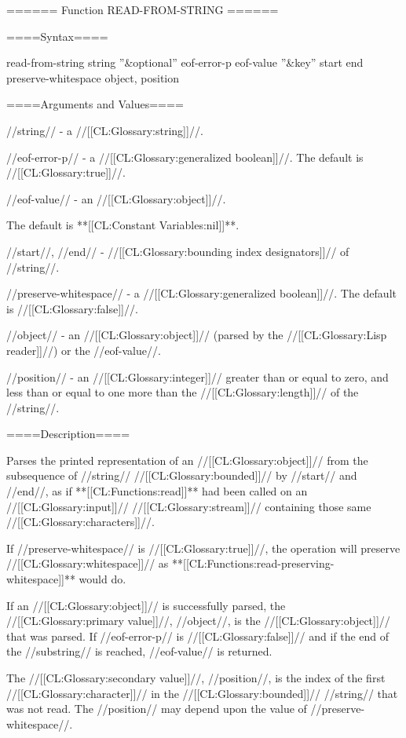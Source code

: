 ====== Function READ-FROM-STRING ======

====Syntax====

\DefunWithValuesNewline read-from-string {string ''&optional'' eof-error-p eof-value ''&key'' start end preserve-whitespace} {object, position}

====Arguments and Values====

//string// - a //[[CL:Glossary:string]]//.

//eof-error-p// - a //[[CL:Glossary:generalized boolean]]//. The default is //[[CL:Glossary:true]]//.

//eof-value// - an //[[CL:Glossary:object]]//.

The default is **[[CL:Constant Variables:nil]]**.

//start//, //end// - //[[CL:Glossary:bounding index designators]]// of //string//. 

//preserve-whitespace// - a //[[CL:Glossary:generalized boolean]]//. The default is //[[CL:Glossary:false]]//.

//object// - an //[[CL:Glossary:object]]// (parsed by the //[[CL:Glossary:Lisp reader]]//) or the //eof-value//.

//position// - an //[[CL:Glossary:integer]]// greater than or equal to zero, and less than or equal to one more than the //[[CL:Glossary:length]]// of the //string//.

====Description====

Parses the printed representation of an //[[CL:Glossary:object]]// from the subsequence of //string// //[[CL:Glossary:bounded]]// by //start// and //end//, as if **[[CL:Functions:read]]** had been called on an //[[CL:Glossary:input]]// //[[CL:Glossary:stream]]// containing those same //[[CL:Glossary:characters]]//.

If //preserve-whitespace// is //[[CL:Glossary:true]]//, the operation will preserve //[[CL:Glossary:whitespace]]// as **[[CL:Functions:read-preserving-whitespace]]** would do.

If an //[[CL:Glossary:object]]// is successfully parsed, the //[[CL:Glossary:primary value]]//, //object//, is the //[[CL:Glossary:object]]// that was parsed. If //eof-error-p// is //[[CL:Glossary:false]]// and if the end of the //substring// is reached, //eof-value// is returned.

The //[[CL:Glossary:secondary value]]//, //position//, is the index of the first //[[CL:Glossary:character]]// in the //[[CL:Glossary:bounded]]// //string// that was not read. The //position// may depend upon the value of //preserve-whitespace//.

